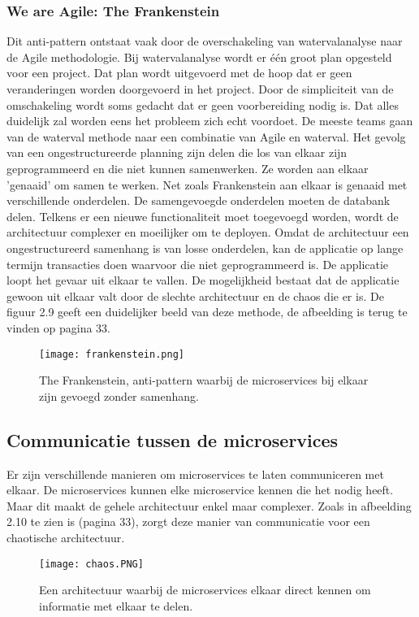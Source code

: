 \subsubsection{We are Agile: The Frankenstein}
Dit anti-pattern ontstaat vaak door de overschakeling van watervalanalyse naar de Agile methodologie. Bij watervalanalyse wordt er één groot plan opgesteld voor een project. Dat plan wordt uitgevoerd met de hoop dat er geen veranderingen worden doorgevoerd in het project. 
Door de simpliciteit van de omschakeling wordt soms gedacht dat er geen voorbereiding nodig is. Dat alles duidelijk zal worden eens het probleem zich echt voordoet. De meeste teams gaan van de waterval methode naar een combinatie van Agile en waterval. 
Het gevolg van een ongestructureerde planning zijn delen die los van elkaar zijn geprogrammeerd en die niet kunnen samenwerken. Ze worden aan elkaar 'genaaid' om samen te werken. Net zoals Frankenstein aan elkaar is genaaid met verschillende onderdelen. De samengevoegde onderdelen moeten de databank delen. Telkens er een nieuwe functionaliteit moet toegevoegd worden, wordt de architectuur complexer en moeilijker om te deployen. 
Omdat de architectuur een ongestructureerd samenhang is van losse onderdelen, kan de applicatie op lange termijn transacties doen waarvoor die niet geprogrammeerd is. De applicatie loopt het gevaar uit elkaar te vallen.
De mogelijkheid bestaat dat de applicatie gewoon uit elkaar valt door de slechte architectuur en de chaos die er is. 
De figuur 2.9 geeft een duidelijker beeld van deze methode, de afbeelding is terug te vinden op pagina 33.
\begin{figure}[h!]
	\texttt{[image: frankenstein.png]}
	\centering
	\caption{The Frankenstein, anti-pattern waarbij de microservices bij elkaar zijn gevoegd zonder samenhang. \textcite{Monson2019}}
\end{figure}



\subsection{Communicatie tussen de microservices}
Er zijn verschillende manieren om microservices te laten communiceren met elkaar. 
De microservices kunnen elke microservice kennen die het nodig heeft. Maar dit maakt de gehele architectuur enkel maar complexer. Zoals in afbeelding 2.10 te zien is (pagina 33), zorgt deze manier van communicatie voor een chaotische architectuur.
\begin{figure}[h!]
	\texttt{[image: chaos.PNG]}
	\centering
	\caption{Een architectuur waarbij de microservices elkaar direct kennen om informatie met elkaar te delen.}
\end{figure}

